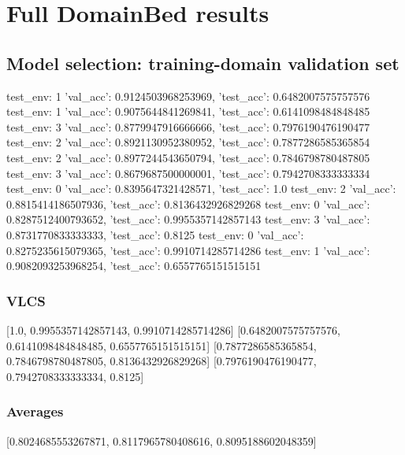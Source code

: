 \documentclass{article}
\begin{document}
\section{Full DomainBed results}

\subsection{Model selection: training-domain validation set}
test_env: 1
{'val_acc': 0.9124503968253969, 'test_acc': 0.6482007575757576}
test_env: 1
{'val_acc': 0.9075644841269841, 'test_acc': 0.6141098484848485}
test_env: 3
{'val_acc': 0.8779947916666666, 'test_acc': 0.7976190476190477}
test_env: 2
{'val_acc': 0.8921130952380952, 'test_acc': 0.7877286585365854}
test_env: 2
{'val_acc': 0.8977244543650794, 'test_acc': 0.7846798780487805}
test_env: 3
{'val_acc': 0.8679687500000001, 'test_acc': 0.7942708333333334}
test_env: 0
{'val_acc': 0.8395647321428571, 'test_acc': 1.0}
test_env: 2
{'val_acc': 0.8815414186507936, 'test_acc': 0.8136432926829268}
test_env: 0
{'val_acc': 0.8287512400793652, 'test_acc': 0.9955357142857143}
test_env: 3
{'val_acc': 0.8731770833333333, 'test_acc': 0.8125}
test_env: 0
{'val_acc': 0.8275235615079365, 'test_acc': 0.9910714285714286}
test_env: 1
{'val_acc': 0.9082093253968254, 'test_acc': 0.6557765151515151}

\subsubsection{VLCS}
[1.0, 0.9955357142857143, 0.9910714285714286]
[0.6482007575757576, 0.6141098484848485, 0.6557765151515151]
[0.7877286585365854, 0.7846798780487805, 0.8136432926829268]
[0.7976190476190477, 0.7942708333333334, 0.8125]

\begin{center}
\end{center}

\subsubsection{Averages}
[0.8024685553267871, 0.8117965780408616, 0.8095188602048359]

\begin{center}
\end{center}
\end{document}
